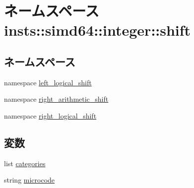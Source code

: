 \hypertarget{namespaceinsts_1_1simd64_1_1integer_1_1shift}{
\section{ネームスペース insts::simd64::integer::shift}
\label{namespaceinsts_1_1simd64_1_1integer_1_1shift}
}
\subsection*{ネームスペース}
\begin{DoxyCompactItemize}
\item 
namespace \hyperlink{namespaceinsts_1_1simd64_1_1integer_1_1shift_1_1left__logical__shift}{left\_\-logical\_\-shift}
\item 
namespace \hyperlink{namespaceinsts_1_1simd64_1_1integer_1_1shift_1_1right__arithmetic__shift}{right\_\-arithmetic\_\-shift}
\item 
namespace \hyperlink{namespaceinsts_1_1simd64_1_1integer_1_1shift_1_1right__logical__shift}{right\_\-logical\_\-shift}
\end{DoxyCompactItemize}
\subsection*{変数}
\begin{DoxyCompactItemize}
\item 
list \hyperlink{namespaceinsts_1_1simd64_1_1integer_1_1shift_a273cf0f1630af14c1582f05e53354a55}{categories}
\item 
string \hyperlink{namespaceinsts_1_1simd64_1_1integer_1_1shift_a770f11a173e99389a8802f0107ed8f52}{microcode}
\end{DoxyCompactItemize}


